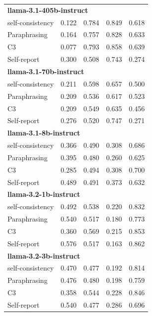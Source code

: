 \documentclass[11pt]{article}
\theoremstyle{plain}
\theoremstyle{definition}
\theoremstyle{remark}
\begin{document}
\begin{table}[p]
\begin{minipage}[t]{0.48\textwidth}
\begin{tabular}{lcccc}
        \midrule
        \multicolumn{5}{l}{\textbf{llama-3.1-405b-instruct}} \\
        self-consistency & 0.122 & 0.784 & 0.849 & 0.618 \\
        Paraphrasing     & 0.164 & 0.757 & 0.828 & 0.633 \\
       C3             & 0.077 & 0.793 & 0.858 & 0.639 \\
        Self-report      & 0.300 & 0.508 & 0.743 & 0.274 \\
        \midrule
        \multicolumn{5}{l}{\textbf{llama-3.1-70b-instruct}} \\
        self-consistency & 0.211 & 0.598 & 0.657 & 0.500 \\
        Paraphrasing     & 0.209 & 0.536 & 0.617 & 0.523 \\
       C3             & 0.209 & 0.549 & 0.635 & 0.456 \\
        Self-report      & 0.276 & 0.520 & 0.747 & 0.271 \\
        \midrule
        \multicolumn{5}{l}{\textbf{llama-3.1-8b-instruct}} \\
        self-consistency & 0.366 & 0.490 & 0.308 & 0.686 \\
        Paraphrasing     & 0.395 & 0.480 & 0.260 & 0.625 \\
       C3             & 0.285 & 0.494 & 0.308 & 0.700 \\
        Self-report      & 0.489 & 0.491 & 0.373 & 0.632 \\
        \midrule
        \multicolumn{5}{l}{\textbf{llama-3.2-1b-instruct}} \\
        self-consistency & 0.492 & 0.538 & 0.220 & 0.832 \\
        Paraphrasing     & 0.540 & 0.517 & 0.180 & 0.773 \\
       C3             & 0.360 & 0.569 & 0.215 & 0.853 \\
        Self-report      & 0.576 & 0.517 & 0.163 & 0.862 \\
        \midrule
        \multicolumn{5}{l}{\textbf{llama-3.2-3b-instruct}} \\
        self-consistency & 0.470 & 0.477 & 0.192 & 0.814 \\
        Paraphrasing     & 0.476 & 0.480 & 0.198 & 0.759 \\
       C3             & 0.358 & 0.544 & 0.228 & 0.846 \\
        Self-report      & 0.540 & 0.477 & 0.286 & 0.696 \\
        \midrule

\end{tabular}
\end{minipage}
\end{table}
\end{document}
